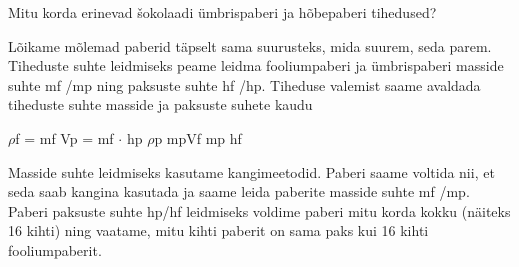 
Mitu korda erinevad šokolaadi ümbrispaberi ja hõbepaberi tihedused?

\hint

\solu
Lõikame mõlemad paberid täpselt sama suurusteks, mida suurem, seda parem. Tiheduste suhte leidmiseks peame leidma fooliumpaberi ja ümbrispaberi masside suhte mf /mp ning paksuste suhte hf /hp. Tiheduse valemist saame avaldada tiheduste suhte masside ja paksuste suhete kaudu

$\rho$f = mf Vp = mf $\cdot$ hp $\rho$p mpVf mp hf

Masside suhte leidmiseks kasutame kangimeetodid. Paberi saame voltida nii, et seda saab kangina kasutada ja saame leida paberite masside suhte mf /mp. Paberi paksuste suhte hp/hf leidmiseks voldime paberi mitu korda kokku (näiteks 16 kihti) ning vaatame, mitu kihti paberit on sama paks kui 16 kihti fooliumpaberit.
\probend
